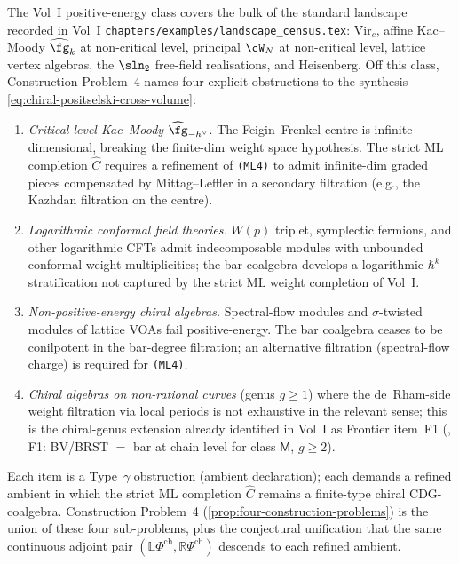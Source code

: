 \begin{remark}
\label{rem:chiral-positselski-residual}
The Vol~I positive-energy class covers the bulk of the standard
landscape recorded in
\textup{Vol~I} \texttt{chapters/examples/landscape\_census.tex}:
$\mathrm{Vir}_c$, affine Kac--Moody $\widehat{\fg}_k$ at non-critical
level, principal $\cW_N$ at non-critical level, lattice vertex algebras,
the $\sln_2$ free-field realisations, and Heisenberg.
Off this class, Construction Problem~4 names four explicit obstructions
to the synthesis \eqref{eq:chiral-positselski-cross-volume}:
\begin{enumerate}[label=\textup{(\roman*)}]
\item \emph{Critical-level Kac--Moody} $\widehat{\fg}_{-h^\vee}$.
The Feigin--Frenkel centre is infinite-dimensional, breaking the
finite-dim weight space hypothesis. The strict ML completion
$\widehat C$ requires a refinement of \texttt{(ML4)} to admit
infinite-dim graded pieces compensated by Mittag--Leffler in a
secondary filtration \textup(e.g., the Kazhdan filtration on the
centre\textup).
\item \emph{Logarithmic conformal field theories.}
$W(p)$ triplet, symplectic fermions, and other logarithmic CFTs
admit indecomposable modules with unbounded conformal-weight
multiplicities; the bar coalgebra develops a logarithmic
$\hbar^k$-stratification not captured by the strict ML weight
completion of Vol~I.
\item \emph{Non-positive-energy chiral algebras.}
Spectral-flow modules and $\sigma$-twisted modules of lattice VOAs
fail positive-energy. The bar coalgebra ceases to be conilpotent
in the bar-degree filtration; an alternative filtration
\textup(spectral-flow charge\textup) is required for
\texttt{(ML4)}.
\item \emph{Chiral algebras on non-rational curves}
\textup(genus $g \geq 1$\textup) where the de~Rham-side
weight filtration via local periods is not exhaustive in the
relevant sense; this is the chiral-genus extension already
identified in Vol~I as Frontier item~F1
\textup(\cite{Vol2FRONTIER}, F1: BV/BRST $=$ bar at chain level
for class $\mathsf{M}$, $g \geq 2$\textup).
\end{enumerate}
Each item is a Type~$\gamma$ obstruction (ambient declaration); each
demands a refined ambient in which the strict ML completion
$\widehat C$ remains a finite-type chiral CDG-coalgebra. Construction
Problem~4 \textup(\cref{prop:four-construction-problems}\textup) is the
union of these four sub-problems, plus the conjectural unification
that the same continuous adjoint pair
$(\mathbb{L}\Phi^{\mathrm{ch}}, \mathbb{R}\Psi^{\mathrm{ch}})$
descends to each refined ambient.
\end{remark}

